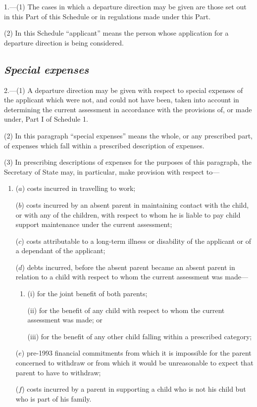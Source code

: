 \documentclass[12pt,a4paper]{article}
\begin{document}
1.---(1) The cases in which a departure direction may be given are those set out in this Part of this Schedule or in regulations made under this Part.

(2) In this Schedule “applicant” means the person whose application for a departure direction is being considered.

\subsection*{\itshape Special expenses}

2.---(1) A departure direction may be given with respect to special expenses of the applicant which were not, and could not have been, taken into account in determining the current assessment in accordance with the provisions of, or made under, Part I of Schedule 1.

(2) In this paragraph “special expenses” means the whole, or any prescribed part, of expenses which fall within a prescribed description of expenses.

(3) In prescribing descriptions of expenses for the purposes of this paragraph, the Secretary of State may, in particular, make provision with respect to—
\begin{enumerate}\item[]
($a$) costs incurred in travelling to work;

($b$) costs incurred by an absent parent in maintaining contact with the child, or with any of the children, with respect to whom he is liable to pay child support maintenance under the current assessment;

($c$) costs attributable to a long-term illness or disability of the applicant or of a dependant of the applicant;

($d$) debts incurred, before the absent parent became an absent parent in relation to a child with respect to whom the current assessment was made—
\begin{enumerate}\item[]
(i) for the joint benefit of both parents;

(ii) for the benefit of any child with respect to whom the current assessment was made; or

(iii) for the benefit of any other child falling within a prescribed category;
\end{enumerate}

($e$) pre-1993 financial commitments from which it is impossible for the parent concerned to withdraw or from which it would be unreasonable to expect that parent to have to withdraw;

($f$) costs incurred by a parent in supporting a child who is not his child but who is part of his family.
\end{enumerate}
\end{document}
